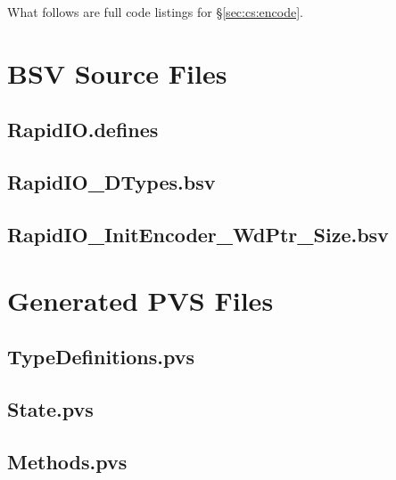 What follows are full code listings for \S \ref{sec:cs:encode}.  

\section{BSV Source Files} \label{app:encode:bsv}
\subsection{RapidIO.defines} \label{app:encode:bsv:riodef}


\subsection{RapidIO\_DTypes.bsv} \label{app:decode:bsv:dtypes}


\subsection{RapidIO\_InitEncoder\_WdPtr\_Size.bsv} \label{app:encode:bsv:dtypes}


\section{Generated PVS Files} \label{app:encode:pvsgen}
\subsection{TypeDefinitions.pvs} \label{app:encode:pvsgen:td}


\subsection{State.pvs} \label{app:encode:pvsgen:state}


\subsection{Methods.pvs} \label{app:encode:pvsgen:meth}


